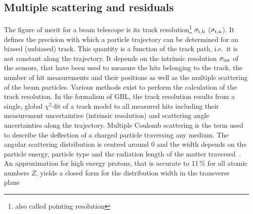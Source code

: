 \subsection{Multiple scattering and residuals}
\label{sec:resmultiple}

The figure of merit for a beam telescope is its track resolution\footnote{also called pointing resolution} $\sigma_{\textrm{t,b}}$ ($\sigma_{\textrm{t,u}}$).
It defines the precision with which a particle trajectory can be determined for an biased (unbiased) track. 
This quantity is a function of the track path, i.e.\ it is not constant along the trajectory. 
It depends on the intrinsic resolution $\sigma_{\textrm{int}}$ of the sensors, that have been used to measure the hits belonging to the track, the number of hit measurements and their positions
 as well as the multiple scattering of the beam particles.
Various methods exist to perform the calculation of the track resolution. 
In the formalism of GBL, the track resolution results from a single, global $\chi^2$-fit of a track model to all measured hits including their measurement uncertainties (intrinsic resolution)
 and scattering angle uncertainties along the trajectory. 
% 
%
%
%
%
%
Multiple Coulomb scattering is the term used to describe the deflection of a charged particle traversing any medium.
The angular scattering distribution is centred around $0$
 and the width depends on the particle energy, particle type and the radiation length of the matter traversed~\cite{ref:scatteringhighland}.
An approximation for high energy protons, that is accurate to 11\,\% for all atomic numbers $Z$, yields a closed form for the distribution width in the transverse plane~\cite{ref:PDG-2014}

